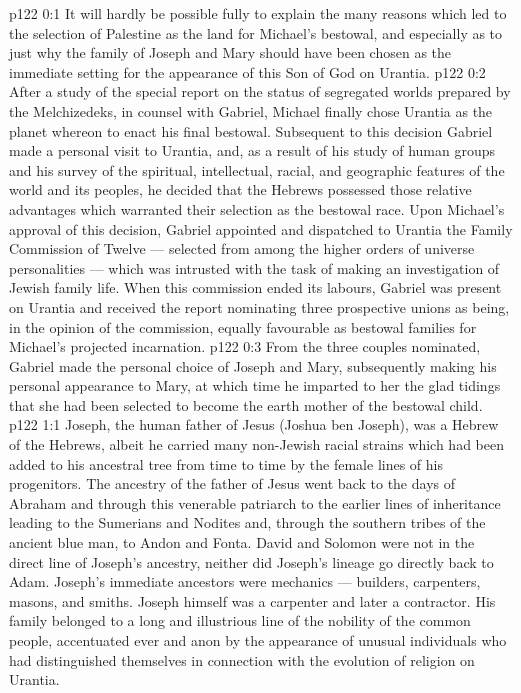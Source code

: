 \author{Midwayer Commission}
\vs p122 0:1 It will hardly be possible fully to explain the many reasons which led to the selection of Palestine as the land for Michael’s bestowal, and especially as to just why the family of Joseph and Mary should have been chosen as the immediate setting for the appearance of this Son of God on Urantia.
\vs p122 0:2 After a study of the special report on the status of segregated worlds prepared by the Melchizedeks, in counsel with Gabriel, Michael finally chose Urantia as the planet whereon to enact his final bestowal. Subsequent to this decision Gabriel made a personal visit to Urantia, and, as a result of his study of human groups and his survey of the spiritual, intellectual, racial, and geographic features of the world and its peoples, he decided that the Hebrews possessed those relative advantages which warranted their selection as the bestowal race. Upon Michael’s approval of this decision, Gabriel appointed and dispatched to Urantia the Family Commission of Twelve --- selected from among the higher orders of universe personalities --- which was intrusted with the task of making an investigation of Jewish family life. When this commission ended its labours, Gabriel was present on Urantia and received the report nominating three prospective unions as being, in the opinion of the commission, equally favourable as bestowal families for Michael’s projected incarnation.
\vs p122 0:3 From the three couples nominated, Gabriel made the personal choice of Joseph and Mary, subsequently making his personal appearance to Mary, at which time he imparted to her the glad tidings that she had been selected to become the earth mother of the bestowal child.
\vs p122 1:1 Joseph, the human father of Jesus (Joshua ben Joseph), was a Hebrew of the Hebrews, albeit he carried many non\hyp{}Jewish racial strains which had been added to his ancestral tree from time to time by the female lines of his progenitors. The ancestry of the father of Jesus went back to the days of Abraham and through this venerable patriarch to the earlier lines of inheritance leading to the Sumerians and Nodites and, through the southern tribes of the ancient blue man, to Andon and Fonta. David and Solomon were not in the direct line of Joseph’s ancestry, neither did Joseph’s lineage go directly back to Adam. Joseph’s immediate ancestors were mechanics --- builders, carpenters, masons, and smiths. Joseph himself was a carpenter and later a contractor. His family belonged to a long and illustrious line of the nobility of the common people, accentuated ever and anon by the appearance of unusual individuals who had distinguished themselves in connection with the evolution of religion on Urantia.
